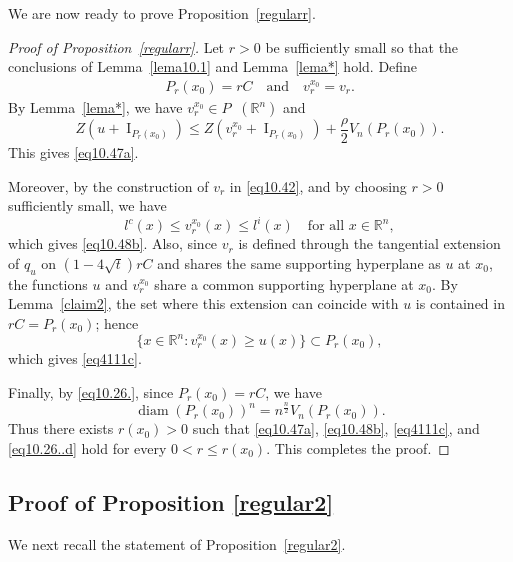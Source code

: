 \documentclass[11pt]{article}
\theoremstyle{definition} %
\newcommand{\RR}{(\mathbb{R}^n)}
\DeclareMathOperator{\I}{I}
\DeclareMathOperator{\LQ}{_{l.q}}
\DeclareMathOperator{\diam}{diam}
\begin{document}
We are now ready to prove Proposition~\ref{regularr}.


\begin{proof}[Proof of Proposition~\ref{regularr}]
Let $r>0$ be sufficiently small so that the conclusions of Lemma~\ref{lema10.1} and Lemma~\ref{lema*} hold. Define
\begin{align}\label{eq10.44}
    P_r(x_0)=rC
    \quad \text{and} \quad
    v_r^{x_0}=v_r.
\end{align}
By Lemma~\ref{lema*}, we have $v_r^{x_0}\in P\LQ\RR$ and
\[
Z(u+\I_{P_r(x_0)})
\le
Z(v_r^{x_0}+\I_{P_r(x_0)})
+\frac{\rho}{2}V_n(P_r(x_0)).
\]
This gives \eqref{eq10.47a}.

Moreover, by the construction of $v_r$ in \eqref{eq10.42}, and by choosing $r>0$ sufficiently small, we have
\[
l^c(x)\leq v_r^{x_0}(x)\leq l^i(x)
\quad \text{for all } x\in\mathbb{R}^n,
\]
which gives \eqref{eq10.48b}. Also, since $v_r$ is defined through the tangential extension of $q_u$ on $(1-4\sqrt{t})rC$ and shares the same supporting hyperplane as $u$ at $x_0$, the functions $u$ and $v_r^{x_0}$ share a common supporting hyperplane at $x_0$. By Lemma~\ref{claim2}, the set where this extension can coincide with $u$ is contained in $rC=P_r(x_0)$; hence
\[
\{x\in\mathbb{R}^n: v_r^{x_0}(x)\geq u(x)\}
\subset P_r(x_0),
\]
which gives \eqref{eq4111c}.

Finally, by \eqref{eq10.26.}, since $P_r(x_0)=rC$, we have
\[
\diam(P_r(x_0))^n
=
n^{\frac n2}V_n(P_r(x_0)).
\]
Thus there exists $r(x_0)>0$ such that \eqref{eq10.47a}, \eqref{eq10.48b}, \eqref{eq4111c}, and \eqref{eq10.26..d} hold for every $0<r\le r(x_0)$. This completes the proof.
\end{proof}



\subsection{Proof of Proposition \ref{regular2}}
We next recall the statement of Proposition~\ref{regular2}.
\end{document}
